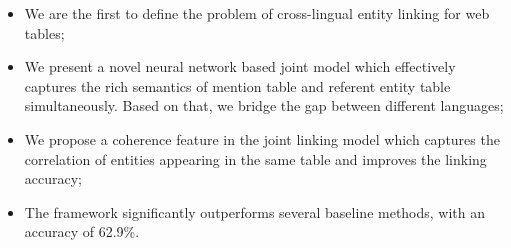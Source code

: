 

%

\begin{itemize}
\itemsep0em
\item We are the first to define the problem of cross-lingual entity linking for web tables;
\item We present a novel neural network based joint model which effectively captures
the rich semantics of mention table and referent entity table simultaneously.
Based on that, we bridge the gap between different languages;
\item We propose a coherence feature in the joint linking model which captures
the correlation of entities appearing in the same table and improves the linking accuracy;
\item The framework significantly outperforms several baseline methods, with an accuracy of 62.9\%.
\end{itemize}
